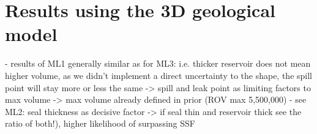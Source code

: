				
		\section{Results using the 3D geological model}
		
		- results of ML1 generally similar as for ML3:
			i.e. thicker reservoir does not mean higher volume, as we didn't implement a direct uncertainty to the shape, the spill point will stay more or less the same
			-> spill and leak point as limiting factors to max volume
			-> max volume already defined in prior (ROV max 5,500,000)
		- see ML2: seal thickness as decisive factor
			-> if seal thin and reservoir thick see the ratio of both!), higher likelihood of surpassing SSF
		